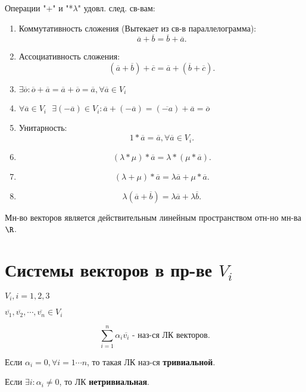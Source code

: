 \begin{theorem}
Операции "+" и "*$\lambda$" удовл. след. св-вам:
\begin{enumerate}
    \item Коммутативность сложения (Вытекает из св-в параллелограмма):
        \[
        \overline{a} + \overline{b} = \overline{b} + \overline{a}
        .\] 
    \item Ассоциативность сложения:
        \[
            (\overline{a} + \overline{b}) + \overline{c} = \overline{a} + (\overline{b} + \overline{c})
        .\] 
    \item $\exists  \overline{o} \colon  \overline{o} + \overline{a} = \overline{a} + \overline{o} = \overline{a}, \forall \overline{a}  \in V_i$
    \item $\forall \overline{a}  \in V_i \text{ }\exists (-\overline{a})  \in V_i \colon \overline{a} + (-\overline{a}) = (\overline{-a}) + \overline{a} = \overline{o}$
    \item Унитарность:
        \[
        1 * \overline{a} = \overline{a}, \forall \overline{a}  \in V_i
        .\] 
    \item \[
            (\lambda * \mu) * \overline{a} = \lambda * (\mu * \overline{a})
    .\] 
\item \[
        (\lambda + \mu) * \overline{a} = \lambda \overline{a} + \mu * \overline{a}
.\] 
\item \[
\lambda(\overline{a} + \overline{b}) = \lambda \overline{a} + \lambda \overline{b}
.\]  
\end{enumerate}
\end{theorem}
\begin{note}
Мн-во векторов является действительным линейным пространством отн-но мн-ва $\R$.
\end{note}

\section{Системы векторов в пр-ве $V_i$}
$ V_i, i = 1, 2, 3$ 

$\overline{v_1}, \overline{v_2}, \cdots, \overline{v_n}  \in V_i$ 

\begin{symb}
    \[
    \sum_{i = 1}^{n}  \alpha_i \overline{v_i} \text{ - наз-ся ЛК векторов}
    .\] 

    Если $\alpha_i = 0, \forall i=1\cdots n$, то такая ЛК наз-ся \textbf{тривиальной}.

    Если $\exists i \colon  \alpha_i \neq 0$, то ЛК \textbf{нетривиальная}.
\end{symb}

